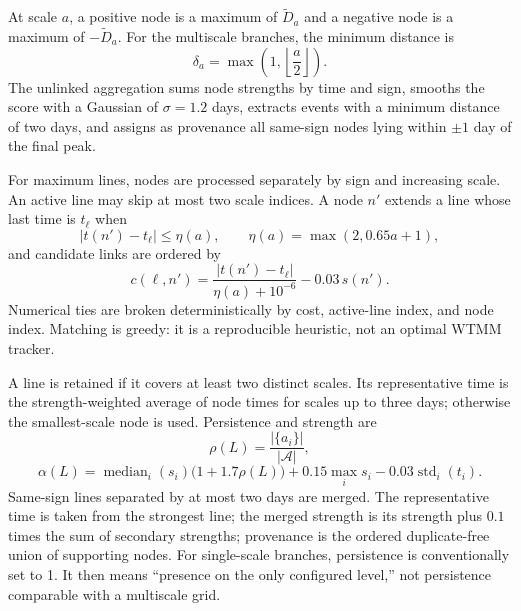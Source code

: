 \documentclass[11pt,a4paper]{article}
\begin{document}
At scale $a$, a positive node is a maximum of $\widetilde D_a$ and a negative node is a maximum of $-\widetilde D_a$. For the multiscale branches, the minimum distance is
\begin{equation}
 \delta_a=\max\left(1,\left\lfloor\frac{a}{2}\right\rfloor\right).
\end{equation}
The unlinked aggregation sums node strengths by time and sign, smooths the score with a Gaussian of $\sigma=1.2$ days, extracts events with a minimum distance of two days, and assigns as provenance all same-sign nodes lying within $\pm1$ day of the final peak.

For maximum lines, nodes are processed separately by sign and increasing scale. An active line may skip at most two scale indices. A node $n'$ extends a line whose last time is $t_\ell$ when
\begin{equation}
 |t(n')-t_\ell|\leq\eta(a),
 \qquad
 \eta(a)=\max(2,0.65a+1),
\end{equation}
and candidate links are ordered by
\begin{equation}
 c(\ell,n')=\frac{|t(n')-t_\ell|}{\eta(a)+10^{-6}}-0.03\,s(n').
\end{equation}
Numerical ties are broken deterministically by cost, active-line index, and node index. Matching is greedy: it is a reproducible heuristic, not an optimal WTMM tracker.

A line is retained if it covers at least two distinct scales. Its representative time is the strength-weighted average of node times for scales up to three days; otherwise the smallest-scale node is used. Persistence and strength are
\begin{equation}
 \rho(L)=\frac{|\{a_i\}|}{|\mathcal{A}|},
\end{equation}
\begin{equation}
 \alpha(L)=\operatorname{median}_i(s_i)\bigl(1+1.7\rho(L)\bigr)
 +0.15\max_i s_i-0.03\operatorname{std}_i(t_i).
\end{equation}
Same-sign lines separated by at most two days are merged. The representative time is taken from the strongest line; the merged strength is its strength plus $0.1$ times the sum of secondary strengths; provenance is the ordered duplicate-free union of supporting nodes. For single-scale branches, persistence is conventionally set to 1. It then means ``presence on the only configured level,'' not persistence comparable with a multiscale grid.
\end{document}
